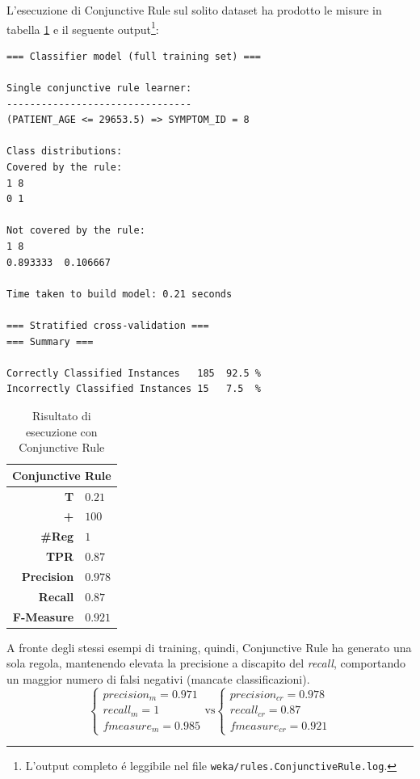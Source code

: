 \documentclass[preprint]{acm_proc_article-sp}
\begin{document}
L'esecuzione di Conjunctive Rule sul solito dataset ha prodotto le misure in tabella \ref{table:risultati-conjunctive-rule} e il seguente output\footnote{L'output completo \'e leggibile nel file \verb|weka/rules.ConjunctiveRule.log|.}:
\begin{verbatim}
=== Classifier model (full training set) ===

Single conjunctive rule learner:
--------------------------------
(PATIENT_AGE <= 29653.5) => SYMPTOM_ID = 8

Class distributions:
Covered by the rule:
1 8 
0 1 

Not covered by the rule:
1 8 
0.893333  0.106667  

Time taken to build model: 0.21 seconds

=== Stratified cross-validation ===
=== Summary ===

Correctly Classified Instances   185  92.5 %
Incorrectly Classified Instances 15   7.5  %
\end{verbatim}

\begin{table}[h]
\centering
\begin{tabular}{|r|l|} \hline
\multicolumn{2}{|c|}{\textbf{Conjunctive Rule}} \\ \hline \hline 
\textbf{T} & $0.21$ \\ \hline
\textbf{+} & $100$ \\ \hline
\textbf{\#Reg} & $1$\\ \hline
\textbf{TPR} & $0.87$ \\ \hline
\textbf{Precision} & $0.978$ \\ \hline
\textbf{Recall} & $0.87$ \\  \hline
\textbf{F-Measure} & $0.921$ \\
\hline\end{tabular}
\caption{Risultato di esecuzione con Conjunctive Rule}
\label{table:risultati-conjunctive-rule}
\end{table}

A fronte degli stessi esempi di training, quindi, Conjunctive Rule ha generato una sola regola, mantenendo elevata la precisione a discapito del \textit{recall}, comportando un maggior numero di falsi negativi (mancate classificazioni).
\[
\begin{cases}
precision_m = 0.971 \\
recall_m = 1 \\
fmeasure_m = 0.985
\end{cases}
\mbox{vs}
\begin{cases}
precision_{cr} = 0.978 \\
recall_{cr} = 0.87 \\
fmeasure_{cr} = 0.921
\end{cases}
\]
\end{document}

